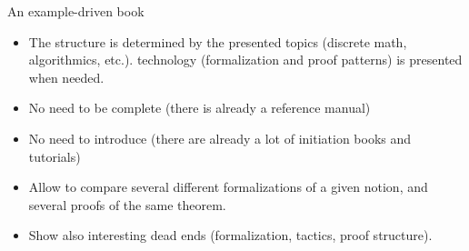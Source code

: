 \documentclass[10pt, fleqn]{beamer}
\begin{document}
  


\begin{frame}
   \begin{block}{An example-driven book}
    \begin{itemize}
    \item The structure is determined by the presented topics (discrete math, algorithmics, etc.). \coq technology (formalization and proof patterns) is presented when needed.
    \item No need to be complete (there is already a reference manual)
    \item No need to introduce \coq (there are already a lot of initiation books and tutorials)
    \item Allow to compare several different formalizations of a given notion, and several proofs of the same theorem.
      \item Show also interesting dead ends (formalization, tactics, proof structure).
    \end{itemize}
  \end{block}
\end{frame}
\end{document}
